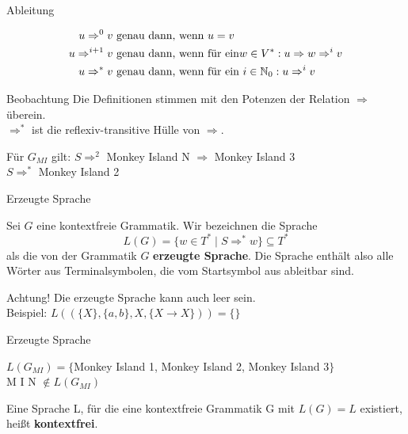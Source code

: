 \begin{frame}{Ableitung}	
	\begin{Definition}
		\begin{align*}
		u \Rightarrow^0 v &\text{ genau dann, wenn } u=v \\
		u \Rightarrow^{i+1} v &\text{ genau dann, wenn für ein}  w\in V^*: u \Rightarrow w \Rightarrow^i v\\
		u \Rightarrow^* v &\text{ genau dann, wenn für ein } i\in\mathbb{N}_0: u \Rightarrow^i v \\
		\end{align*}
	\end{Definition}
	
	\pause
	\begin{block}{Beobachtung}
		Die Definitionen stimmen mit den Potenzen der Relation $\Rightarrow$ überein.\\
		$\Rightarrow^\ast$ ist die reflexiv-transitive Hülle von $\Rightarrow$.
	\end{block}

	\pause
	\begin{Beispiel}
		Für $G_{MI}$ gilt: $S \Rightarrow^2$ Monkey Island N $\Rightarrow$ Monkey Island 3\\
		$S \Rightarrow^*$ Monkey Island 2
	\end{Beispiel}
\end{frame}


\begin{frame}{Erzeugte Sprache}
	\begin{Definition}
		Sei $G$ eine kontextfreie Grammatik. Wir bezeichnen die Sprache $$L(G) = \{w \in T^\ast \mid S \Rightarrow^\ast w \} \subseteq T^*$$ als die von der Grammatik $G$ \textbf{erzeugte Sprache}. Die Sprache enthält also alle Wörter aus Terminalsymbolen, die vom Startsymbol aus ableitbar sind.
	\end{Definition} \pause

	\begin{alertblock}{Achtung!}
		Die erzeugte Sprache kann auch leer sein. \\
		Beispiel: $L\left(\left(\{X\},\{a,b\},X,\{X\to X\}\right)\right) = \{\}$
	\end{alertblock}
\end{frame}

\begin{frame}{Erzeugte Sprache}
	\begin{Beispiel}
		$L(G_{MI}) = \{$Monkey Island 1, Monkey Island 2, Monkey Island 3$\}$\\
		M I N $\notin L(G_{MI})$
	\end{Beispiel}
	
	\pause
	\begin{Definition}
		Eine Sprache L, für die eine kontextfreie Grammatik G mit $L(G) = L$ existiert, heißt \textbf{kontextfrei}.
	\end{Definition}
		
\end{frame}

